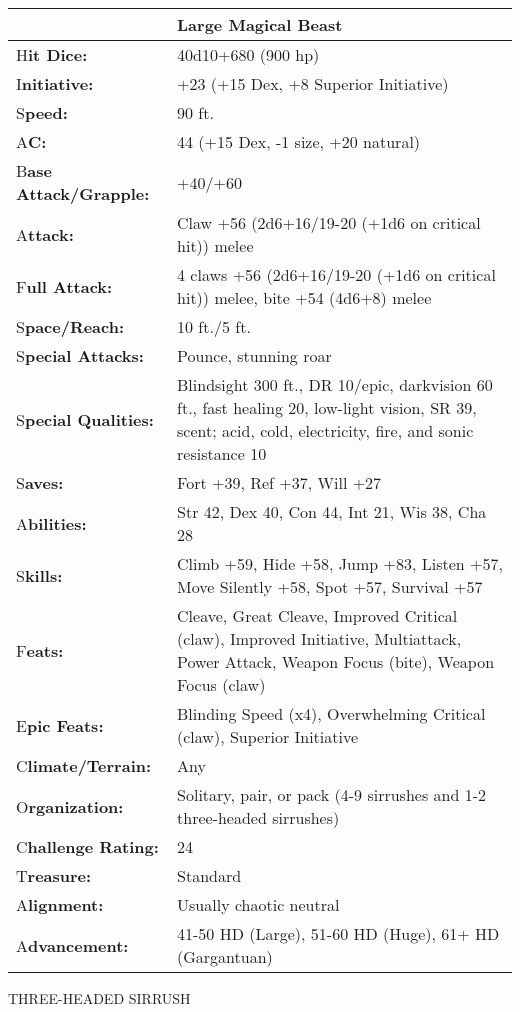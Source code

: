 \documentclass{article}
\begin{document}
{\begin{tabular}{|>{\raggedright}p{64pt}|>{\raggedright}p{262pt}|}
\hline
  & Large Magical Beast \tabularnewline
\hline
H\textbf{it Dice:} & 40d10+680 (900 hp) \tabularnewline
\hline
I\textbf{nitiative:} & +23 (+15 Dex, +8 Superior Initiative) \tabularnewline
\hline
S\textbf{peed:} & 90 ft. \tabularnewline
\hline
A\textbf{C:} & 44 (+15 Dex, -1 size, +20 natural) \tabularnewline
\hline
B\textbf{ase Attack/Grapple:} & +40/+60\tabularnewline
\hline
A\textbf{ttack:} & Claw +56 (2d6+16/19-20 (+1d6 on critical hit)) melee\tabularnewline
\hline
F\textbf{ull Attack:} & 4 claws +56 (2d6+16/19-20 (+1d6 on critical hit)) melee, 
bite +54 (4d6+8) melee\tabularnewline
\hline
S\textbf{pace/Reach:} & 10 ft./5 ft. \tabularnewline
\hline
S\textbf{pecial Attacks:} & Pounce, stunning roar \tabularnewline
\hline
S\textbf{pecial Qualities:} & Blindsight 300 ft., DR 10/epic, darkvision 60 ft., 
fast healing 20, low-light vision, SR 39, scent; acid, cold, electricity, fire, 
and sonic resistance 10 \tabularnewline
\hline
S\textbf{aves:} & Fort +39, Ref +37, Will +27 \tabularnewline
\hline
A\textbf{bilities:} & Str 42, Dex 40, Con 44, Int 21, Wis 38, Cha 28 \tabularnewline
\hline
S\textbf{kills:} & Climb +59, Hide +58, Jump +83, Listen +57, Move Silently +58, 
Spot +57, Survival +57\tabularnewline
\hline
F\textbf{eats:} & Cleave, Great Cleave, Improved Critical (claw), Improved Initiative, 
Multiattack, Power Attack, Weapon Focus (bite), Weapon Focus (claw) \tabularnewline
\hline
E\textbf{pic Feats:} & Blinding Speed (x4), Overwhelming Critical (claw), Superior 
Initiative \tabularnewline
\hline
C\textbf{limate/Terrain:} & Any \tabularnewline
\hline
O\textbf{rganization:} & Solitary, pair, or pack (4-9 sirrushes and 1-2 three-headed 
sirrushes) \tabularnewline
\hline
C\textbf{hallenge Rating:} & 24 \tabularnewline
\hline
T\textbf{reasure:} & Standard \tabularnewline
\hline
A\textbf{lignment:} & Usually chaotic neutral \tabularnewline
\hline
A\textbf{dvancement:} & 41-50 HD (Large), 51-60 HD (Huge), 61+ HD (Gargantuan) 
\tabularnewline
\hline
\end{tabular}

\vspace{12pt}
{\LARGE{}THREE-HEADED SIRRUSH }

}
\end{document}
